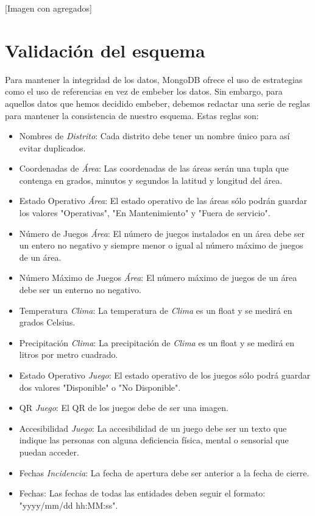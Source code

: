 \documentclass[]{article}
\begin{document}
[Imagen con agregados]


\section{Validación del esquema}
\label{sec:esquema}
Para mantener la integridad de los datos, MongoDB ofrece el uso de estrategias como el uso de referencias en vez de embeber los datos. Sin embargo, para aquellos datos que hemos decidido embeber, debemos redactar una serie de reglas para mantener la consistencia de nuestro esquema. Estas reglas son:
\begin{itemize}
    \item Nombres de \textit{Distrito}: Cada distrito debe tener un nombre único para así evitar duplicados.
    \item Coordenadas de \textit{Área}: Las coordenadas de las áreas serán una tupla que contenga en grados, minutos y segundos la latitud y longitud del área.
    \item Estado Operativo \textit{Área}: El estado operativo de las áreas sólo podrán guardar los valores "Operativas", "En Mantenimiento" y "Fuera de servicio".
    \item Número de Juegos \textit{Área}: El número de juegos instalados en un área debe ser un entero no negativo y siempre menor o igual al número máximo de juegos de un área.
    \item Número Máximo de Juegos \textit{Área}: El número máximo de juegos de un área debe ser un enterno no negativo.
    \item Temperatura \textit{Clima}: La temperatura de \textit{Clima} es un float y se medirá en grados Celsius.
    \item Precipitación \textit{Clima}: La precipitación de \textit{Clima} es un float y se medirá en litros por metro cuadrado.
    \item Estado Operativo \textit{Juego}: El estado operativo de los juegos sólo podrá guardar dos valores "Disponible" o "No Disponible".
    \item QR \textit{Juego}: El QR de los juegos debe de ser una imagen.
    \item Accesibilidad \textit{Juego}: La accesibilidad de un juego debe ser un texto que indique las personas con alguna deficiencia física, mental o sensorial que puedan acceder.
    \item Fechas \textit{Incidencia}: La fecha de apertura debe ser anterior a la fecha de cierre.
    \item Fechas: Las fechas de todas las entidades deben seguir el formato: "yyyy/mm/dd hh:MM:ss".
\end{itemize}
\end{document}
